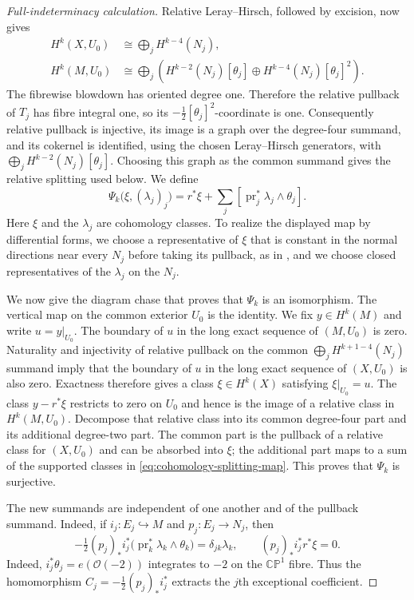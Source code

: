 \documentclass[11pt]{article}
\theoremstyle{remark}\newtheorem{remark}[theorem]{Remark}
\newcommand{\CP}{\mathbb {CP}}
\begin{document}
\begin{proof}[Full-indeterminacy calculation]
Relative Leray--Hirsch, followed by excision, now gives
\begin{align*}
 H^k(X,U_0)&\cong\bigoplus_j H^{k-4}(N_j),\\
 H^k(M,U_0)&\cong\bigoplus_j\left(
 H^{k-2}(N_j)[\theta_j]\oplus H^{k-4}(N_j)[\theta_j]^2\right).
\end{align*}
The fibrewise blowdown has oriented degree one.  Therefore the relative
pullback of $T_j$ has fibre integral one, so its
$-\frac12[\theta_j]^2$-coordinate is one.  Consequently relative pullback
is injective, its image is a graph over the degree-four summand, and its
cokernel is identified, using the chosen Leray--Hirsch generators, with
$\bigoplus_jH^{k-2}(N_j)[\theta_j]$.  Choosing this graph as the common
summand gives the relative splitting used below.  We define
\begin{equation}\label{eq:cohomology-splitting-map}
 \Psi_k\bigl(\xi,(\lambda_j)_j\bigr)
 =r^*\xi+\sum_j
   [\operatorname{pr}_j^*\lambda_j\wedge\theta_j].
\end{equation}
Here $\xi$ and the $\lambda_j$ are cohomology classes.  To realize the
displayed map by differential forms, we choose a representative of $\xi$
that is constant in the normal directions near every $N_j$ before taking
its pullback, as in \cite[Section 3]{MM}, and we choose closed
representatives of the $\lambda_j$ on the $N_j$.

We now give the diagram chase that proves that $\Psi_k$ is an
isomorphism.  The vertical map on the common exterior $U_0$ is the
identity.  We fix $y\in H^k(M)$ and write $u=y|_{U_0}$.  The boundary of $u$
in the long exact sequence of $(M,U_0)$ is zero.  Naturality and
injectivity of relative pullback on the common
$\bigoplus_jH^{k+1-4}(N_j)$ summand imply that the boundary of $u$ in the
long exact sequence of $(X,U_0)$ is also zero.  Exactness therefore gives
a class $\xi\in H^k(X)$ satisfying $\xi|_{U_0}=u$.  The class
$y-r^*\xi$ restricts to zero on $U_0$ and hence is the image of a relative
class in $H^k(M,U_0)$.  Decompose that relative class into its common
degree-four part and its additional degree-two part.  The common part is
the pullback of a relative class for $(X,U_0)$ and can be absorbed into
$\xi$; the additional part maps to a sum of the supported classes in
\eqref{eq:cohomology-splitting-map}.  This proves that $\Psi_k$ is
surjective.

The new summands are independent of one another and of the pullback
summand.  Indeed, if
$i_j:E_j\hookrightarrow M$ and $p_j:E_j\to N_j$, then
\begin{equation}\label{eq:exceptional-coefficient-map}
 -\tfrac12(p_j)_*i_j^*
 \bigl(\operatorname{pr}_k^*\lambda_k\wedge\theta_k\bigr)
 =\delta_{jk}\lambda_k,
 \qquad
 (p_j)_*i_j^*r^*\xi=0.
\end{equation}
Indeed, $i_j^*\theta_j=e(\mathcal O(-2))$ integrates to $-2$ on the
$\CP^1$ fibre.  Thus the homomorphism
$C_j=-\frac12(p_j)_*i_j^*$ extracts the $j$th exceptional coefficient.


\end{proof}
\end{document}
